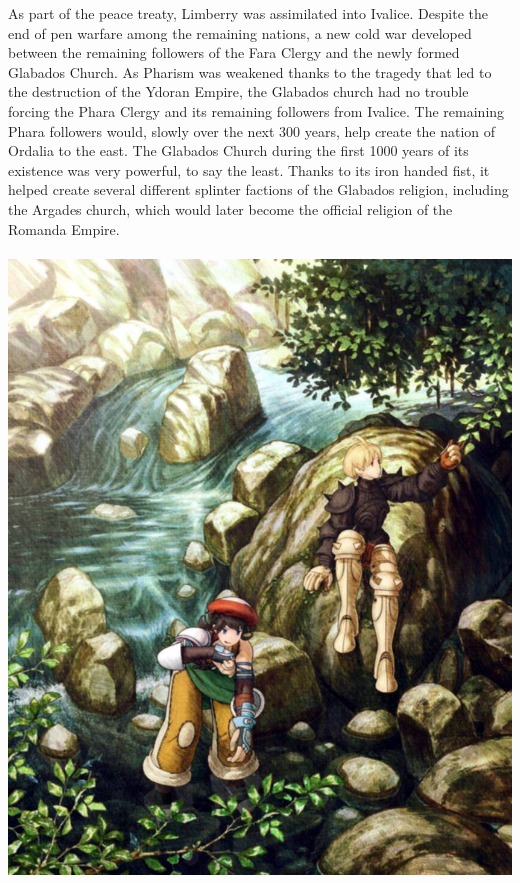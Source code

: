 As part of the peace treaty, Limberry was assimilated into Ivalice. 
Despite the end of pen warfare among the remaining nations, a new cold war developed between the remaining followers of the Fara Clergy and the newly formed Glabados Church.
As Pharism was weakened thanks to the tragedy that led to the destruction of the Ydoran Empire, the Glabados church had no trouble forcing the Phara Clergy and its remaining followers from Ivalice. 
The remaining Phara followers would, slowly over the next 300 years, help create the nation of Ordalia to the east.
The Glabados Church during the first 1000 years of its existence was very powerful, to say the least.
Thanks to its iron handed fist, it helped create several different splinter factions of the Glabados religion, including the Argades church, which would later become the official religion of the Romanda Empire.
%
\\\\
\includegraphics[width=\columnwidth]{./art/images/luso.jpg}
\\\\
%
\\
